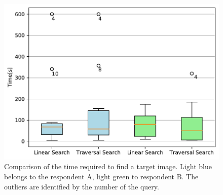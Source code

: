 \begin{figure}
    \centering
    \includegraphics[width=0.7\linewidth]{graphs/face_search_time.pdf}
    \caption{Comparison of the time required to find a target image. Light blue belongs to the respondent A, light green to respondent B. The outliers are identified by the number of the query.}
    \label{fig:search_time}
\end{figure}